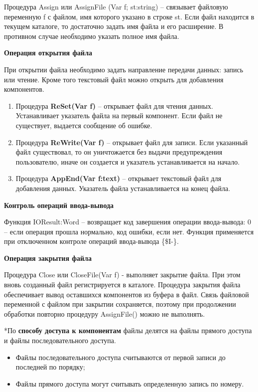 Процедура Assign или AssignFile (Var f; st:string) – связывает файловую переменную f с файлом, имя которого указано в строке st.  
Если файл находится в текущем каталоге, то достаточно задать имя файла и его расширение. В противном случае необходимо указать полное имя файла.

{\bf Операция открытия файла}

При открытии файла необходимо задать направление передачи данных: запись или чтение. Кроме того текстовый файл можно открыть для добавления компонентов.

\begin{enumerate}
    \item Процедура {\bf ReSet(Var f)} – открывает файл для чтения данных. 
	Устанавливает указатель файла на первый компонент. Если файл не существует, выдается сообщение об ошибке.
    \item Процедура {\bf ReWrite(Var f)} – открывает файл для записи. 
	Если указанный файл существовал, то он уничтожается без выдачи предупреждения пользователю, иначе он создается и указатель устанавливается на начало.
    \item Процедура {\bf AppEnd(Var f:text)} – открывает текстовый файл для добавления данных. Указатель файла устанавливается на конец файла.
\end{enumerate}

{\bf Контроль операций ввода-вывода}

Функция IOResult:Word – возвращает код завершения операции ввода-вывода: 0 – если операция прошла нормально, код ошибки, если нет. Функция применяется при отключенном контроле операций ввода-вывода \{\$I-\}. 

{\bf Операция закрытия файла}

Процедура Close или CloseFile(Var f) - выполняет закрытие файла. При этом вновь созданный файл регистрируется в каталоге. Процедура закрытия файла обеспечивает вывод оставшихся компонентов из буфера в файл. Связь файловой переменной с файлом при закрытии сохраняется, поэтому при продолжении обработки повторно процедуру AssignFile() можно не выполнять. 

*По {\bf{способу доступа к компонентам}} файлы делятся на файлы прямого доступа и файлы
последовательного доступа. 
\begin{itemize}
    \item Файлы последовательного доступа считываются
от первой записи до последней по порядку;
    \item Файлы прямого доступа могут считывать определенную запись по
номеру.
\end{itemize}

